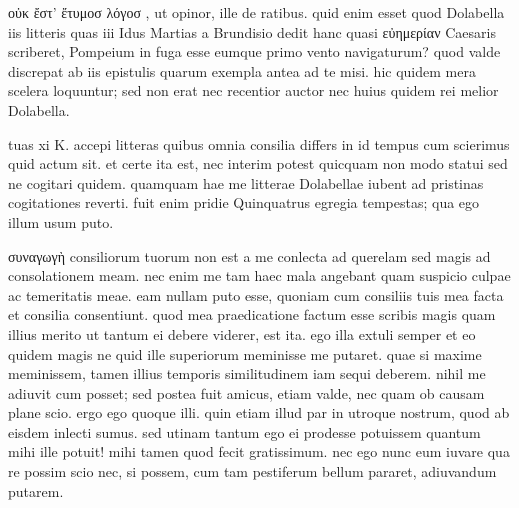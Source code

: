 


 οὐκ ἔστ' ἔτυμοσ λόγοσ , ut opinor, ille de ratibus. quid enim esset quod Dolabella iis litteris quas iii Idus Martias a Brundisio dedit hanc quasi εὐημερίαν Caesaris scriberet, Pompeium in fuga esse eumque primo vento navigaturum? quod valde discrepat ab iis epistulis quarum exempla antea ad te misi. hic quidem mera scelera loquuntur; sed non erat nec recentior auctor nec huius quidem rei melior Dolabella.

 tuas xi K. accepi litteras quibus omnia consilia differs in id tempus cum scierimus quid actum sit. et certe ita est, nec interim potest quicquam non modo statui sed ne cogitari quidem. quamquam hae me litterae Dolabellae iubent ad pristinas cogitationes reverti. fuit enim pridie Quinquatrus egregia tempestas; qua ego illum usum puto.

 συναγωγὴ consiliorum tuorum non est a me conlecta ad querelam sed magis ad consolationem meam. nec enim me tam haec mala angebant quam suspicio culpae ac temeritatis meae. eam nullam puto esse, quoniam cum consiliis tuis mea facta et consilia consentiunt. quod mea praedicatione factum esse scribis magis quam illius merito ut tantum ei debere viderer, est ita. ego illa extuli semper et eo quidem magis ne quid ille superiorum meminisse me putaret. quae si maxime meminissem, tamen illius temporis similitudinem iam sequi deberem. nihil me adiuvit cum posset; sed postea fuit amicus, etiam valde, nec quam ob causam plane scio. ergo ego quoque illi. quin etiam illud par in utroque nostrum, quod ab eisdem inlecti sumus. sed utinam tantum ego ei prodesse potuissem quantum mihi ille potuit! mihi tamen quod fecit gratissimum. nec ego nunc eum iuvare qua re possim scio nec, si possem, cum tam pestiferum bellum pararet, adiuvandum putarem.

